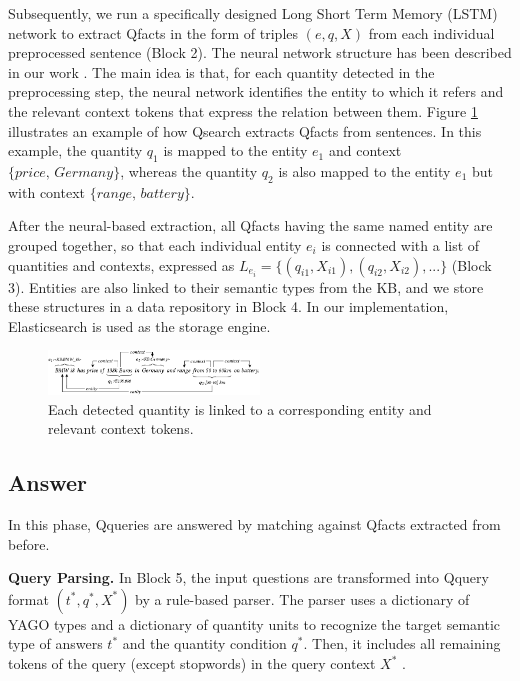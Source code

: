 Subsequently, we run a specifically designed Long Short Term Memory (LSTM) network to extract Qfacts in the form of triples $(e,q,X)$ from each individual preprocessed sentence (Block 2). The neural network structure has been described in our work \cite{HoISWC2019}. The main idea is that, for each quantity detected in the preprocessing step, the neural network identifies the entity to which it refers
and the relevant context tokens that express the relation between them. Figure \ref{fig:example} illustrates an example of how Qsearch extracts Qfacts from sentences. In this example, the quantity $q_1$ is mapped to the entity $e_1$ and context $\{\textit{price, Germany}\}$, whereas the quantity $q_2$ is also mapped to the entity $e_1$ but with context $\{\textit{range, battery}\}$.


After the neural-based extraction, all Qfacts having the same named entity are grouped together, so that each individual entity $e_i$ is connected with a list of quantities and contexts, expressed as $L_{e_i} = \{(q_{i1},X_{i1}),(q_{i2},X_{i2}),... \}$ (Block 3).
Entities are also linked to their semantic types from the KB, and we store these structures in a data repository in Block 4. In our implementation, Elasticsearch is used as the storage engine.

\begin{figure}[t]
\centering
\includegraphics[width=0.5\textwidth]{figures/example_2.pdf}
\caption{Each detected quantity is linked to a corresponding entity and relevant context tokens.}
\label{fig:example}
\vspace{-1em}
\end{figure}

\subsection{Answer}
In this phase, Qqueries are answered by matching against Qfacts extracted from before. 

\noindent \textbf{Query Parsing.} In Block 5, the input questions are transformed into Qquery format $(t^*,q^*,X^*)$ by a rule-based parser. The parser uses a dictionary of YAGO types and a dictionary of quantity units to recognize the target semantic type of answers $t^*$ and the quantity condition $q^*$. Then, it includes all remaining tokens of the query (except stopwords) in the query context $X^*$ \cite{HoISWC2019}.

